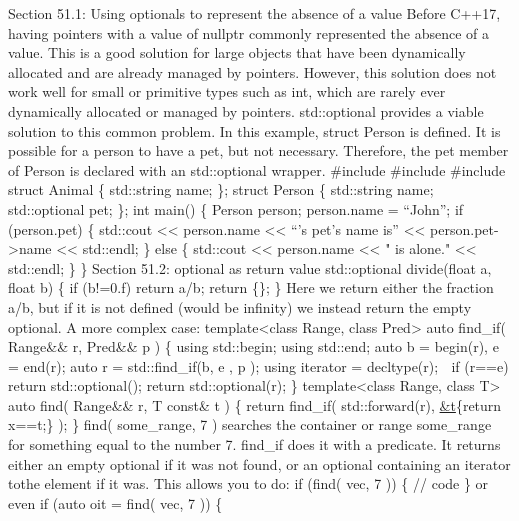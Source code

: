Section 51.1: Using optionals to represent the absence of a value Before
C++17, having pointers with a value of nullptr commonly represented the
absence of a value. This is a good solution for large objects that have
been dynamically allocated and are already managed by pointers. However,
this solution does not work well for small or primitive types such as
int, which are rarely ever dynamically allocated or managed by pointers.
std::optional provides a viable solution to this common problem. In this
example, struct Person is deﬁned. It is possible for a person to have a
pet, but not necessary. Therefore, the pet member of Person is declared
with an std::optional wrapper. \#include \#include \#include struct
Animal \{ std::string name; \}; struct Person \{ std::string name;
std::optional pet; \}; int main() \{ Person person; person.name =
``John''; if (person.pet) \{ std::cout \textless\textless{} person.name
\textless\textless{} ``'s pet's name is'' \textless\textless{}
person.pet-\textgreater name \textless\textless{} std::endl; \} else \{
std::cout \textless\textless{} person.name \textless\textless{} " is
alone." \textless\textless{} std::endl; \} \} Section 51.2: optional as
return value std::optional divide(float a, float b) \{ if (b!=0.f)
return a/b; return \{\}; \} Here we return either the fraction a/b, but
if it is not deﬁned (would be inﬁnity) we instead return the empty
optional. A more complex case: template\textless class Range, class
Pred\textgreater{} auto find\_if( Range\&\& r, Pred\&\& p ) \{ using
std::begin; using std::end; auto b = begin(r), e = end(r); auto r =
std::find\_if(b, e , p ); using iterator = decltype(r);  if (r==e)
return std::optional(); return std::optional(r); \}
template\textless class Range, class T\textgreater{} auto find(
Range\&\& r, T const\& t ) \{ return find\_if( std::forward(r),
\href{auto\&\&\%20x}{\&t}\{return x==t;\} ); \} find( some\_range, 7 )
searches the container or range some\_range for something equal to the
number 7. find\_if does it with a predicate. It returns either an empty
optional if it was not found, or an optional containing an iterator
tothe element if it was. This allows you to do: if (find( vec, 7 )) \{
// code \} or even if (auto oit = find( vec, 7 )) \{
